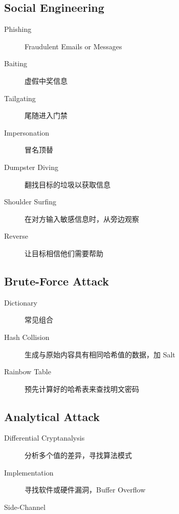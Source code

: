 \documentclass[11pt,journal,compsoc]{IEEEtran}
\begin{document}
\subsection{Social Engineering}

\begin{description}
    \item[Phishing] Fraudulent Emails or Messages

    \item[Baiting] 虚假中奖信息

    \item[Tailgating] 尾随进入门禁

    \item[Impersonation] 冒名顶替

    \item[Dumpster Diving] 翻找目标的垃圾以获取信息

    \item[Shoulder Surfing] 在对方输入敏感信息时，从旁边观察

    \item[Reverse] 让目标相信他们需要帮助
\end{description}


\subsection{Brute-Force Attack}

\begin{description}
    \item[Dictionary] 常见组合

    \item[Hash Collision] 生成与原始内容具有相同哈希值的数据，加 Salt

    \item[Rainbow Table] 预先计算好的哈希表来查找明文密码
\end{description}


\subsection{Analytical Attack}

\begin{description}
    \item[Differential Cryptanalysis] 分析多个值的差异，寻找算法模式

    \item[Implementation] 寻找软件或硬件漏洞，Buffer Overflow

    \item[Side-Channel]
\end{description}
\end{document}
